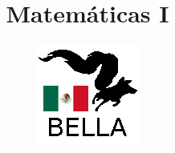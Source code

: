 \documentclass{book}
\begin{document}
\title{Matemáticas I}
\author{\includegraphics{../../logos/128x128-mexico.png}}

\maketitle

\tableofcontents













\end{document}
